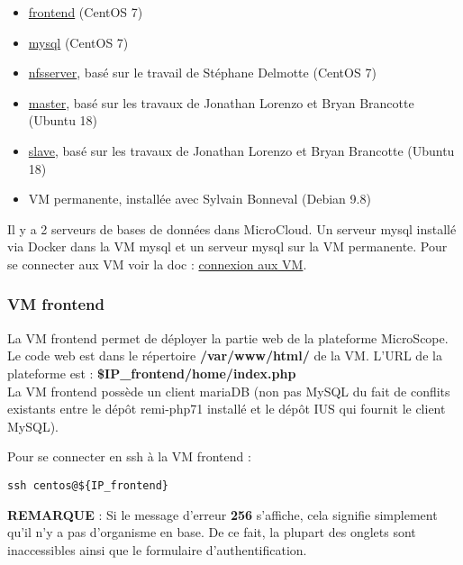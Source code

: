 \begin{itemize}
	\item \href{https://github.com/IFB-ElixirFr/biosphere-microcloud/tree/master/frontend/}{frontend} (CentOS 7)
	\item \href{https://github.com/IFB-ElixirFr/biosphere-microcloud/tree/master/mysql/}{mysql} (CentOS 7)
	\item \href{https://github.com/IFB-ElixirFr/biosphere-microcloud/tree/master/nfsserver/}{nfsserver}, basé sur le travail de Stéphane Delmotte (CentOS 7)
	\item \href{https://github.com/IFB-ElixirFr/biosphere-microcloud/tree/master/master/}{master}, basé sur les travaux de Jonathan Lorenzo et Bryan Brancotte (Ubuntu 18)
	\item \href{https://github.com/IFB-ElixirFr/biosphere-microcloud/tree/master/slave/}{slave}, basé sur les travaux de Jonathan Lorenzo et Bryan Brancotte (Ubuntu 18)
	\item VM permanente, installée avec Sylvain Bonneval (Debian 9.8)
\end{itemize}
Il y a 2 serveurs de bases de données dans MicroCloud. Un serveur mysql installé via Docker dans la VM mysql et un serveur mysql sur la VM permanente. Pour se connecter aux VM voir la doc : \href{https://intranet.genoscope.cns.fr/agc/redmine/projects/microcloud/wiki/Connexion_aux_VM}{connexion aux VM}.

\subsubsection {VM frontend}

La VM frontend permet de déployer la partie web de la plateforme MicroScope.
Le code web est dans le répertoire \textbf{/var/www/html/} de la VM.
L'URL de la plateforme est : \textbf{\$IP\_frontend/home/index.php}\\
La VM frontend possède un client mariaDB (non pas MySQL du fait de conflits existants entre le dépôt remi-php71 installé et le dépôt IUS qui fournit le client MySQL).
\newline

Pour se connecter en ssh à la VM frontend : 
\begin{lstlisting}[style=Bash]
ssh centos@${IP_frontend}
\end{lstlisting}

\begin{mycolorbox}\textbf{REMARQUE} : Si le message d’erreur \textbf{256} s’affiche, cela signifie simplement qu’il n’y a pas d’organisme en base. De ce fait, la plupart des onglets sont inaccessibles ainsi que le formulaire d’authentification.\end{mycolorbox}

